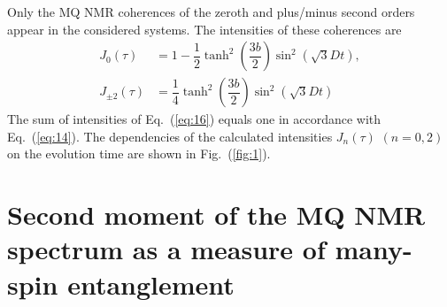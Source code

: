 \documentclass[review]{elsarticle}
\begin{document}
Only the MQ NMR coherences of the zeroth and plus/minus second orders appear in the considered systems. 
The intensities of these coherences are
%
\begin{equation}
    \begin{split}
        \label{eq:16}
        J_0(\tau) & = 1 
        - \dfrac 1 2 \tanh^2\left( \dfrac{3b}{2} \right)
            \sin^2 \left( \sqrt{3} Dt \right), 
        \\
        J_{\pm2}(\tau) & = \dfrac{1}{4} 
            \tanh^2 \left( \dfrac{3b}{2} \right)
            \sin^2 \left( \sqrt{3} Dt \right)
    \end{split}
\end{equation}
%
The sum of intensities of Eq.~(\ref{eq:16}) equals one in accordance with Eq.~(\ref{eq:14}).
The dependencies of the calculated intensities $J_{n}(\tau)$ $(n=0,2)$ on the evolution time are shown in Fig.~(\ref{fig:1}).



\section{Second moment of the MQ NMR spectrum as a measure of many-spin entanglement}
\label{sec:4}
\end{document}

